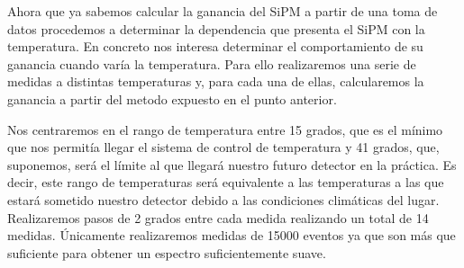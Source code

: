 Ahora que ya sabemos calcular la ganancia del SiPM a partir de una toma de datos procedemos a determinar la dependencia que presenta el SiPM con la temperatura. En concreto nos interesa determinar el comportamiento de su ganancia cuando varía la temperatura. Para ello realizaremos una serie de medidas a distintas temperaturas y, para cada una de ellas, calcularemos la ganancia a partir del metodo expuesto en el punto anterior.

Nos centraremos en el rango de temperatura entre 15 grados, que es el mínimo que nos permitía llegar el sistema de control de temperatura y 41 grados, que, suponemos, será el límite al que llegará nuestro futuro detector en la práctica. Es decir, este rango de temperaturas será equivalente a las temperaturas a las que estará sometido nuestro detector debido a las condiciones climáticas del lugar. Realizaremos pasos de 2 grados entre cada medida realizando un total de 14 medidas. Únicamente realizaremos medidas de 15000 eventos ya que son más que suficiente para obtener un espectro suficientemente suave. 

